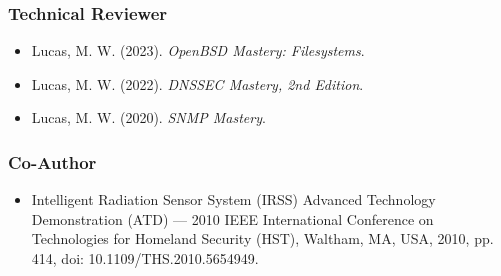 \documentclass[letterpaper,10pt]{article}
\begin{document}
\subsubsection*{Technical Reviewer}
\begin{itemize}
\item Lucas, M. W. (2023). \textit{OpenBSD Mastery: Filesystems}.
\item Lucas, M. W. (2022). \textit{DNSSEC Mastery, 2nd Edition}.
\item Lucas, M. W. (2020). \textit{SNMP Mastery}.
\end{itemize}

\subsubsection*{Co-Author}
\begin{itemize}
\item Intelligent  Radiation   Sensor  System   (IRSS)  Advanced   Technology
  Demonstration (ATD)  --- 2010  IEEE International Conference  on Technologies
  for  Homeland Security  (HST), Waltham,  MA,  USA, 2010,  pp. 414,  doi:
  10.1109/THS.2010.5654949.
\end{itemize}
\end{document}
